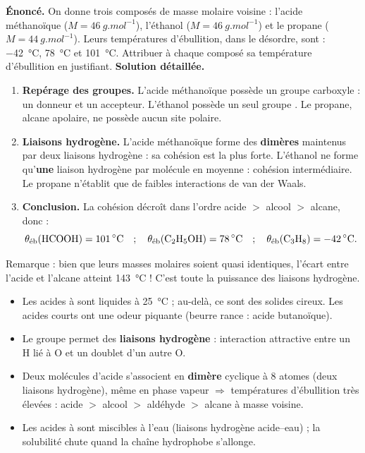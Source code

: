 \documentclass[11pt]{article}
\begin{document}
\begin{exoresolu}
\textbf{Énoncé.} On donne trois composés de masse molaire voisine : l'acide méthanoïque  ($M = \SI{46}{g.mol^{-1}}$), l'éthanol  ($M = \SI{46}{g.mol^{-1}}$) et le propane  ($M = \SI{44}{g.mol^{-1}}$). Leurs températures d'ébullition, dans le désordre, sont : \SI{-42}{\celsius}, \SI{78}{\celsius} et \SI{101}{\celsius}. Attribuer à chaque composé sa température d'ébullition en justifiant.
\tcblower
\textbf{Solution détaillée.}
\begin{enumerate}
\item \textbf{Repérage des groupes.} L'acide méthanoïque possède un groupe carboxyle  : un  donneur et un  accepteur. L'éthanol possède un seul groupe . Le propane, alcane apolaire, ne possède aucun site polaire.
\item \textbf{Liaisons hydrogène.} L'acide méthanoïque forme des \textbf{dimères} maintenus par deux liaisons hydrogène : sa cohésion est la plus forte. L'éthanol ne forme qu'\textbf{une} liaison hydrogène par molécule en moyenne : cohésion intermédiaire. Le propane n'établit que de faibles interactions de van der Waals.
\item \textbf{Conclusion.} La cohésion décroît dans l'ordre acide $>$ alcool $>$ alcane, donc :
\[ \theta_{\text{éb}}(\ce{HCOOH}) = \SI{101}{\celsius} \quad ; \quad \theta_{\text{éb}}(\ce{C2H5OH}) = \SI{78}{\celsius} \quad ; \quad \theta_{\text{éb}}(\ce{C3H8}) = \SI{-42}{\celsius}. \]
\end{enumerate}
Remarque : bien que leurs masses molaires soient quasi identiques, l'écart entre l'acide et l'alcane atteint \SI{143}{\celsius} ! C'est toute la puissance des liaisons hydrogène.
\end{exoresolu}

\begin{aretenir}
\begin{itemize}
\item Les acides  à  sont liquides à \SI{25}{\celsius} ; au-delà, ce sont des solides cireux. Les acides courts ont une odeur piquante (beurre rance : acide butanoïque).
\item Le groupe  permet des \textbf{liaisons hydrogène} : interaction attractive entre un H lié à O et un doublet d'un autre O.
\item Deux molécules d'acide s'associent en \textbf{dimère} cyclique à 8 atomes (deux liaisons hydrogène), même en phase vapeur $\Rightarrow$ températures d'ébullition très élevées : acide $>$ alcool $>$ aldéhyde $>$ alcane à masse voisine.
\item Les acides  à  sont miscibles à l'eau (liaisons hydrogène acide--eau) ; la solubilité chute quand la chaîne hydrophobe s'allonge.
\end{itemize}
\end{aretenir}
\end{document}
